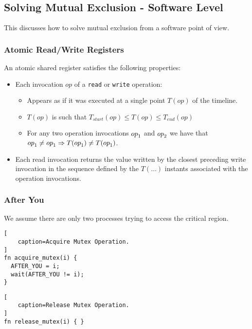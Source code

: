 

\subsection{Solving Mutual Exclusion - Software Level}

This discusses how to solve mutual exclusion from a software point of view.

\subsubsection{Atomic Read/Write Registers}

An atomic shared register satisfies the following properties:
\begin{itemize}
    \item Each invocation $op$ of a \texttt{read} or \texttt{write} operation:
    \begin{itemize}
        \item Appears as if it was executed at a single point $T(op)$ of the timeline.
        \item $T(op)$ is such that $T_{start}(op) \le T(op) \le T_{end}(op)$
        \item For any two operation invocations $\mathnormal{op}_1$ and $\mathnormal{op}_2$ we have that
        $\mathnormal{op}_1 \neq \mathnormal{op}_1 \Rightarrow T(\mathnormal{op}_1) \neq T(\mathnormal{op}_1)$.
    \end{itemize}
    \item Each read invocation returns the value written by the closest preceding write invocation in the sequence defined by the $T(\dots)$ instants associated with the operation invocations.
\end{itemize}

\subsubsection{After You}

We assume there are only two processes trying to access the critical region.

\begin{lstlisting}[
    caption=Acquire Mutex Operation.
]
fn acquire_mutex(i) {
  AFTER_YOU = i;
  wait(AFTER_YOU != i);
}
\end{lstlisting}

\begin{lstlisting}[
    caption=Release Mutex Operation.
]
fn release_mutex(i) { }
\end{lstlisting}

